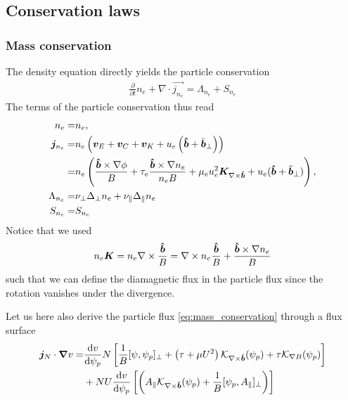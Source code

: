 \subsection{Conservation laws} \label{sec:conservation}
\subsubsection{Mass conservation}
The density equation directly yields the particle conservation
\begin{align} \label{eq:mass_theorem}
  \frac{\partial}{\partial t} n_e
  + \nabla\cdot\vec{ j_{n_e}}
  =  \Lambda_{n_e}+S_{n_e}
\end{align}
The terms of the particle conservation thus read
\begin{align} \label{eq:mass_conservation}
  n_e= & n_e,\\
  {\boldsymbol{j}}_{n_e} =& n_e\left(
  {\boldsymbol{v}}_E + {\boldsymbol{v}}_C + {\boldsymbol{v}}_{K} +u_e\left(\bm{\hat{b}}+\tilde{{\boldsymbol{b}}}_\perp\right)  \right) \nonumber\\
  =& n_e \left(\frac{\bm{\hat{b}}\times \nabla\phi}{B} 
  + \tau_e \frac{\bm{\hat{b}}\times\nabla n_e}{n_eB} 
  + \mu_e u_e^2{\boldsymbol{K}}_{\nabla\times\bm{\hat{b}}} 
  + u_e(\bm{\hat{b}} + \tilde{{\boldsymbol{b}}}_\perp) \right), \\
  \Lambda_{n_e} =&
  \nu_\perp\Delta_\perp n_e + \nu_\parallel\Delta_\parallel n_e
\\
  S_{n_e} =&  S_{n_e}
\end{align}
Notice that we used
\begin{align}
n_e {\boldsymbol{K}} = n_e\nabla\times\frac{\bm{\hat{b}}}{B} = \nabla\times n_e\frac{\bm{\hat{b}}}{B} + \frac{\bm{\hat{b}}\times\nabla n_e}{B}
\label{}
\end{align}
such that we can define the diamagnetic flux in the particle flux since
the rotation vanishes under the divergence.

Let us here also derive the particle flux \eqref{eq:mass_conservation} through a flux surface
\begin{align} \label{eq:particle_flux}
 \vec j_{N}\cdot \vec \nabla v %
 =&
  \frac{\d v}{\d \psi_p} N\left[\frac{1}{B}[\psi, \psi_p]_\perp + \left(\tau + \mu U^2\right)
   \mathcal K_{\nabla\times\bhat}(\psi_p) + \tau  \mathcal K_{\nabla B}(\psi_p) \right] \nonumber\\
 &+ NU\frac{\d v}{\d \psi_p}\left [\left( A_\parallel \mathcal
 K_{\nabla\times\bhat}(\psi_p) + \frac{1}{B}[\psi_p, A_\parallel]_\perp\right) \right] \\
\end{align}


